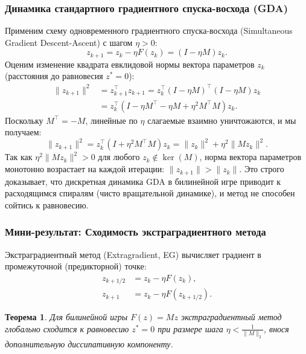 \documentclass[12pt,a4paper]{article}
\newtheorem{theorem}{Теорема}
\begin{document}
	\subsubsection{Динамика стандартного градиентного спуска-восхода (GDA)}
	Применим схему одновременного градиентного спуска-восхода (Simultaneous Gradient Descent-Ascent) с шагом $\eta > 0$:
	\begin{equation}
		z_{k+1} = z_k - \eta F(z_k) = (I - \eta M)z_k.
	\end{equation}
	Оценим изменение квадрата евклидовой нормы вектора параметров $z_k$ (расстояния до равновесия $z^* = 0$):
	\begin{align}
		\|z_{k+1}\|^2 &= z_{k+1}^\top z_{k+1} = z_k^\top (I - \eta M)^\top (I - \eta M) z_k \nonumber \\
		&= z_k^\top (I - \eta M^\top - \eta M + \eta^2 M^\top M) z_k.
	\end{align}
	Поскольку $M^\top = -M$, линейные по $\eta$ слагаемые взаимно уничтожаются, и мы получаем:
	\begin{equation}
		\|z_{k+1}\|^2 = z_k^\top (I + \eta^2 M^\top M) z_k = \|z_k\|^2 + \eta^2 \|Mz_k\|^2.
	\end{equation}
	Так как $\eta^2 \|Mz_k\|^2 > 0$ для любого $z_k \notin \ker(M)$, норма вектора параметров монотонно возрастает на каждой итерации: $\|z_{k+1}\| > \|z_k\|$. Это строго доказывает, что дискретная динамика GDA в билинейной игре приводит к расходящимся спиралям (чисто вращательной динамике), и метод не способен сойтись к равновесию.
	
	\subsubsection{Мини-результат: Сходимость экстраградиентного метода}
	Экстраградиентный метод (Extragradient, EG) вычисляет градиент в промежуточной (предикторной) точке:
	\begin{align}
		z_{k+1/2} &= z_k - \eta F(z_k), \\
		z_{k+1} &= z_k - \eta F(z_{k+1/2}).
	\end{align}
	
	\begin{theorem}
		Для билинейной игры $F(z) = Mz$ экстраградиентный метод глобально сходится к равновесию $z^*=0$ при размере шага $\eta < \frac{1}{\|M\|_2}$, внося дополнительную диссипативную компоненту.
	\end{theorem}
	
\end{document}
